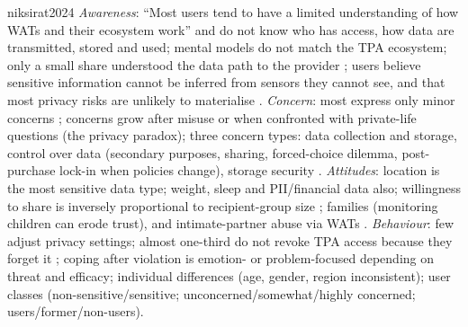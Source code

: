 \begin{papercard}{niksirat2024}
 \emph{Awareness}: ``Most users tend to have a limited understanding of how WATs and their ecosystem work'' and do not know who has access, how data are transmitted, stored and used; mental models do not match the TPA ecosystem; only a small share understood the data path to the provider ; users believe sensitive information cannot be inferred from sensors they cannot see, and that most privacy risks are unlikely to materialise . \emph{Concern}: most express only minor concerns ; concerns grow after misuse or when confronted with private-life questions (the privacy paradox); three concern types: data collection and storage, control over data (secondary purposes, sharing, forced-choice dilemma, post-purchase lock-in when policies change), storage security . \emph{Attitudes}: location is the most sensitive data type; weight, sleep and PII/financial data also; willingness to share is inversely proportional to recipient-group size ; families (monitoring children can erode trust), and intimate-partner abuse via WATs . \emph{Behaviour}: few adjust privacy settings; almost one-third do not revoke TPA access because they forget it ; coping after violation is emotion- or problem-focused depending on threat and efficacy; individual differences (age, gender, region inconsistent); user classes (non-sensitive/sensitive; unconcerned/somewhat/highly concerned; users/former/non-users).


\end{papercard}
